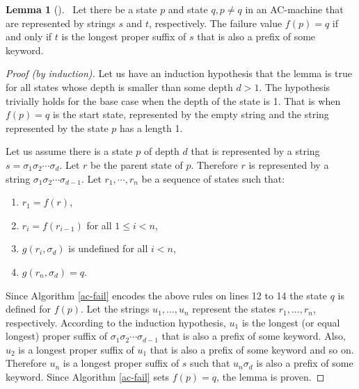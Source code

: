 \documentclass[english,twoside,censored,csm,algorithms-track-2020]{HYthesisML}
\theoremstyle{plain}
\theoremstyle{definition}
\newtheorem{lemma}[theorem]{Lemma}
\begin{document}
\begin{lemma}[]~\label{lem-overlap}
  Let there be a state $p$ and state $q, p\neq q$ in an AC-machine that are represented by strings
  $s$ and $t$, respectively. The failure value $f(p) = q$ if and only if $t$ is the longest proper suffix
  of $s$ that is also a prefix of some keyword.
\end{lemma}
\begin{proof}[Proof (by induction)]
  Let us have an induction hypothesis that the lemma is true for all states whose depth is smaller
  than some depth $d > 1$. The hypothesis trivially holds for the base case when the
  depth of the state is 1. That is when $f(p) = q$ is the start state, represented by the empty
  string and the string represented by the state $p$ has a length 1.
  
  Let us assume there is a state $p$ of depth $d$ that is represented by a string
  $s=\sigma_1\sigma_2\cdots \sigma_d$. Let $r$ be the parent state of $p$. Therefore $r$ is represented by a
  string $\sigma_1\sigma_2\cdots \sigma_{d-1}$. Let $r_1,\cdots ,r_n$ be a sequence of states such that:

  \begin{enumerate}[leftmargin=28pt]
  \item $r_1 = f(r)$,
  \item $r_i = f(r_{i-1})$ for all $ 1 \leq i < n$,
  \item $g(r_i, \sigma_d)$ is undefined for all $i < n$,
  \item $g(r_n, \sigma_d) = q$.
  \end{enumerate}

  Since Algorithm \ref{ac-fail} encodes the above rules on lines 12 to 14 the state $q$ is defined
  for $f(p)$. Let the strings $u_1,...,u_n$ represent the states $r_1,...,r_n$, respectively.
  According to the induction hypothesis, $u_1$ is the longest (or equal longest) proper suffix of $\sigma_1\sigma_2\cdots \sigma_{d-1}$
  that is also a prefix of some keyword. Also, $u_2$ is a longest proper suffix of $u_1$ that is also
  a prefix of some keyword and so on. Therefore $u_n$ is a longest proper suffix of $s$ such that
  $u_n\sigma_d$ is also a prefix of some keyword. Since Algorithm \ref{ac-fail} sets $f(p) = q$,
  the lemma is proven.

\end{proof}  
\end{document}

